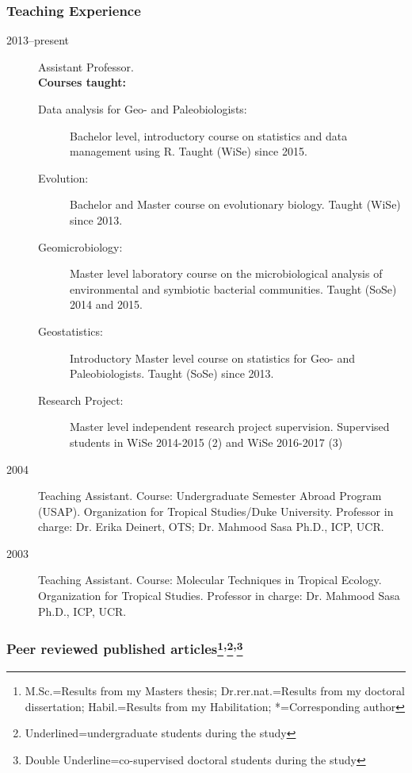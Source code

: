 \documentclass[letter,10pt]{article}
\begin{document}
\subsubsection*{Teaching Experience}
\begin{description}
\item[2013--present] Assistant Professor.\\\textbf{Courses taught:}
  \begin{description} 
	\item[Data analysis for Geo- and Paleobiologists:] Bachelor level, introductory course on statistics and data management using R. Taught (WiSe) since 2015.
	\item[Evolution:] Bachelor and Master course on evolutionary biology. Taught (WiSe) since 2013.
	\item[Geomicrobiology:] Master level laboratory course on the microbiological analysis of environmental and symbiotic bacterial communities. Taught (SoSe) 2014 and 2015.
	\item[Geostatistics:] Introductory Master level course on statistics for Geo- and Paleobiologists. Taught (SoSe) since 2013.
	\item[Research Project:] Master level independent research project supervision. Supervised students in WiSe 2014-2015 (2) and WiSe 2016-2017 (3)
  \end{description}


\item[2004] Teaching Assistant. Course: Undergraduate Semester Abroad Program (USAP). Organization for Tropical Studies/Duke University. Professor in charge: Dr. Erika Deinert, OTS; Dr. Mahmood Sasa Ph.D., ICP, UCR.

\item[2003] Teaching Assistant. Course: Molecular Techniques in Tropical Ecology. Organization for Tropical Studies. Professor in charge: Dr. Mahmood Sasa Ph.D., ICP, UCR.
\end{description}

\subsubsection*{Peer reviewed published articles\footnote{M.Sc.=Results from my Masters thesis; Dr.rer.nat.=Results from my doctoral dissertation; Habil.=Results from my Habilitation; *=Corresponding author}\textsuperscript{,}\footnote{Underlined=undergraduate students during the study}\textsuperscript{,}\footnote{Double Underline=co-supervised doctoral students during the study}}%
\end{document}

